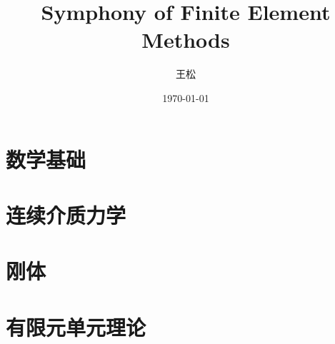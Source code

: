 \documentclass[lang=cn,newtx,10pt,scheme=chinese]{elegantbook}
\title{Symphony of Finite Element Methods}
\author{王松}
\date{\today}
\begin{document}
\maketitle
\frontmatter

\tableofcontents

\mainmatter

\part{数学基础}

\part{连续介质力学}

\part{刚体}

\part{有限元单元理论}
\end{document}
